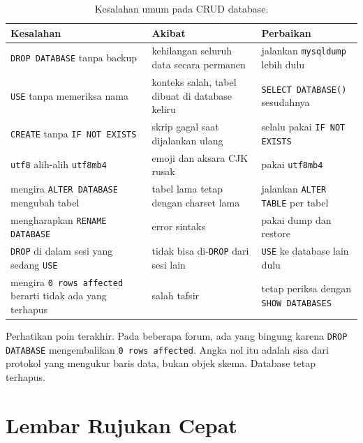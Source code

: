 \documentclass[11pt,a4paper]{article}
\begin{document}
\begin{table}[H]
	\centering
	\caption{Kesalahan umum pada CRUD database.}
	\label{tab:mistakes}
	\footnotesize
	\begin{tabularx}{\textwidth}{l X X}
		\toprule
		Kesalahan                                                        & Akibat                                         & Perbaikan                                    \\
		\midrule
		\texttt{DROP DATABASE} tanpa backup                              & kehilangan seluruh data secara permanen        & jalankan \texttt{mysqldump} lebih dulu       \\
		\texttt{USE} tanpa memeriksa nama                                & konteks salah, tabel dibuat di database keliru & \texttt{SELECT DATABASE()} sesudahnya        \\
		\texttt{CREATE} tanpa \texttt{IF NOT EXISTS}                     & skrip gagal saat dijalankan ulang              & selalu pakai \texttt{IF NOT EXISTS}          \\
		\texttt{utf8} alih-alih \texttt{utf8mb4}                         & emoji dan aksara CJK rusak                     & pakai \texttt{utf8mb4}                       \\
		mengira \texttt{ALTER DATABASE} mengubah tabel                   & tabel lama tetap dengan charset lama           & jalankan \texttt{ALTER TABLE} per tabel      \\
		mengharapkan \texttt{RENAME DATABASE}                            & error sintaks                                  & pakai dump dan restore                       \\
		\texttt{DROP} di dalam sesi yang sedang \texttt{USE}             & tidak bisa di-\texttt{DROP} dari sesi lain     & \texttt{USE} ke database lain dulu           \\
		mengira \texttt{0 rows affected} berarti tidak ada yang terhapus & salah tafsir                                   & tetap periksa dengan \texttt{SHOW DATABASES} \\
		\bottomrule
	\end{tabularx}
\end{table}

Perhatikan poin terakhir. Pada beberapa forum, ada yang bingung karena \texttt{DROP DATABASE} mengembalikan \texttt{0 rows affected}. Angka nol itu adalah sisa dari protokol yang mengukur baris data, bukan objek skema. Database tetap terhapus.

\section{Lembar Rujukan Cepat}
\end{document}
